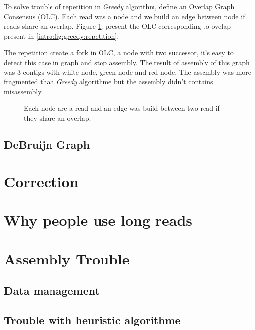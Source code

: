 \documentclass[main.tex]{subfiles}
\begin{document}
To solve trouble of repetition in \textit{Greedy} algorithm, %
define an Overlap Graph Consensus (OLC). Each read was a node and we build an edge between node if reads share an overlap. Figure \ref{intro:fig:olc:graph}, present the OLC corresponding to ovelap present in \ref{intro:fig:greedy:repetition}.

The repetition create a fork in OLC, a node with two successor, it's easy to detect this case in graph and stop assembly. The result of assembly of this graph was 3 contigs with white node, green node and red node. The assembly was more fragmented than \textit{Greedy} algorithme but the assembly didn't contains misassembly.

\begin{figure}[ht]
    \centering 
    
    \caption{Each node are a read and an edge was build between two read if they share an overlap.}
    \label{intro:fig:olc:graph}
\end{figure}

\subsection{DeBruijn Graph}





\section{Correction}

\section{Why people use long reads}

\section{Assembly Trouble}

\subsection{Data management}

\subsection{Trouble with heuristic algorithme}

\end{document}
